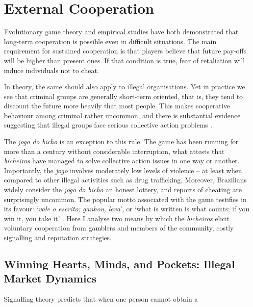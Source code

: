 \documentclass[a4paper,12pt]{article}
\begin{document}
\section{External Cooperation}%
\label{sec:external}

Evolutionary game theory \citep{axelrod1984evolution, axelrod1985achieving, smith1982evolution} and empirical studies \citep{isaac1984divergent, ostrom1990governing} have both demonstrated that long-term cooperation is possible even in difficult situations. The main requirement for sustained cooperation is that players believe that future pay-offs will be higher than present ones. If that condition is true, fear of retaliation will induce individuals not to cheat. 

In theory, the same should also apply to illegal organisations. Yet in practice we see that criminal groups are generally short-term oriented, that is, they tend to discount the future more heavily that most people. This makes cooperative behaviour among criminal rather uncommon, and there is substantial evidence suggesting that illegal groups face serious collective action problems \citep[e.g.,][]{gambetta2009codes, leeson2010pirational, skarbek2011governance, skarbek2012prison, varese2001russian}. 

The \textit{jogo do bicho} is an exception to this rule. The game has been running for more than a century without considerable interruption, what attests that \textit{bicheiros} have managed to solve collective action issues in one way or another. Importantly, the \textit{jogo} involves moderately low levels of violence -- at least when compared to other illegal activities such as drug trafficking. Moreover, Brazilians widely consider the \textit{jogo do bicho} an honest lottery, and reports of cheating are surprisingly uncommon. The popular motto associated with the game testifies in its favour: `\textit{vale o escrito; ganhou, leva}', or `what is written is what counts; if you win it, you take it' \citep{magalhaes2005ganhou}. Here I analyse two means by which the \textit{bicheiros} elicit voluntary cooperation from gamblers and members of the community, costly signalling and reputation strategies. 

\subsection{Winning Hearts, Minds, and Pockets: Illegal Market Dynamics}%
\label{sub:pockets}

Signalling theory predicts that when one person cannot obtain a 
\end{document}
